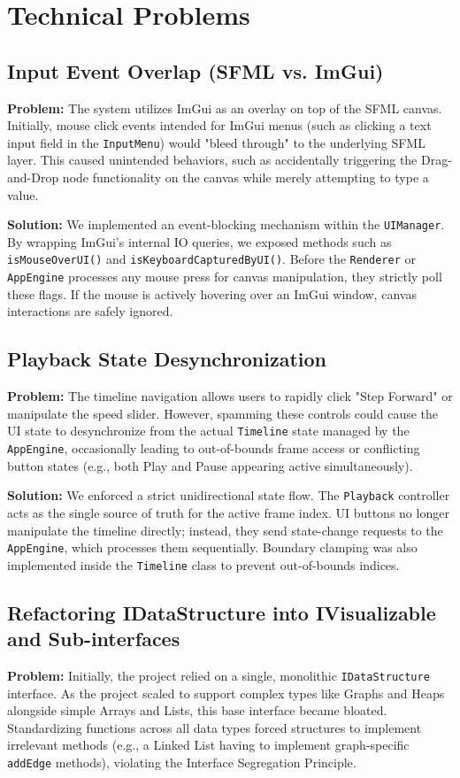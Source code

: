 \section{Technical Problems}

\subsection{Input Event Overlap (SFML vs. ImGui)}
\textbf{Problem:} The system utilizes ImGui as an overlay on top of the SFML canvas. Initially, mouse click events intended for ImGui menus (such as clicking a text input field in the \texttt{InputMenu}) would "bleed through" to the underlying SFML layer. This caused unintended behaviors, such as accidentally triggering the Drag-and-Drop node functionality on the canvas while merely attempting to type a value.

\textbf{Solution:} We implemented an event-blocking mechanism within the \texttt{UIManager}. By wrapping ImGui's internal IO queries, we exposed methods such as \texttt{isMouseOverUI()} and \texttt{isKeyboardCapturedByUI()}. Before the \texttt{Renderer} or \texttt{AppEngine} processes any mouse press for canvas manipulation, they strictly poll these flags. If the mouse is actively hovering over an ImGui window, canvas interactions are safely ignored.

\subsection{Playback State Desynchronization}
\textbf{Problem:} The timeline navigation allows users to rapidly click "Step Forward" or manipulate the speed slider. However, spamming these controls could cause the UI state to desynchronize from the actual \texttt{Timeline} state managed by the \texttt{AppEngine}, occasionally leading to out-of-bounds frame access or conflicting button states (e.g., both Play and Pause appearing active simultaneously).

\textbf{Solution:} We enforced a strict unidirectional state flow. The \texttt{Playback} controller acts as the single source of truth for the active frame index. UI buttons no longer manipulate the timeline directly; instead, they send state-change requests to the \texttt{AppEngine}, which processes them sequentially. Boundary clamping was also implemented inside the \texttt{Timeline} class to prevent out-of-bounds indices.

\subsection{Refactoring IDataStructure into IVisualizable and Sub-interfaces}
\textbf{Problem:} Initially, the project relied on a single, monolithic \texttt{IDataStructure} interface. As the project scaled to support complex types like Graphs and Heaps alongside simple Arrays and Lists, this base interface became bloated. Standardizing functions across all data types forced structures to implement irrelevant methods (e.g., a Linked List having to implement graph-specific \texttt{addEdge} methods), violating the Interface Segregation Principle.

